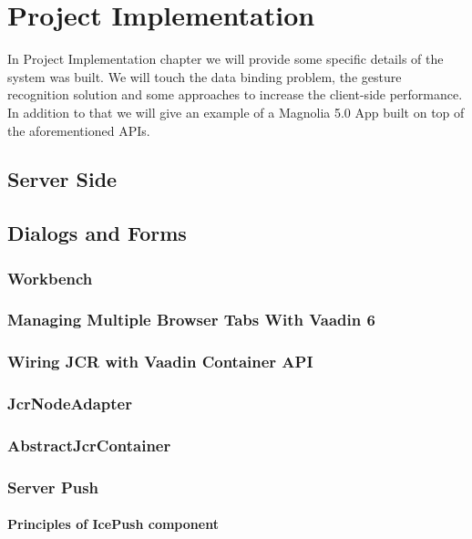 \chapter{Project Implementation}
\label{implementation}
In Project Implementation chapter we will provide some specific details of the
system was built. We will touch the data binding problem, the gesture
recognition solution and some approaches to increase the client-side
performance. In addition to that we will give an example of a Magnolia 5.0 App
built on top of the aforementioned APIs.

\section{Server Side}

\section{Dialogs and Forms}


\subsection{Workbench}

\subsection{Managing Multiple Browser Tabs With Vaadin 6}

\subsection{Wiring JCR with Vaadin Container API}
 
\subsection{JcrNodeAdapter}

\subsection{AbstractJcrContainer}

\subsection{Server Push}

\subsubsection{Principles of IcePush component}

